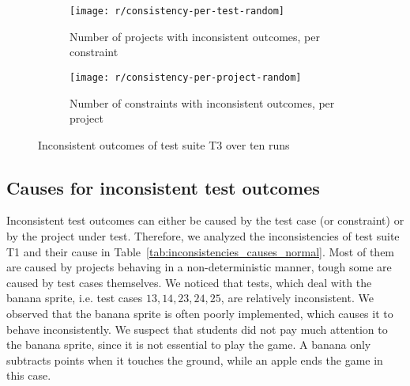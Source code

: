 \begin{figure}[htpb]
    \centering
    \begin{subfigure}{.75\textwidth}
        \texttt{[image: r/consistency-per-test-random]}%
        \vspace{-\medskipamount}
        \caption{Number of projects with inconsistent outcomes, per constraint}
        \label{fig:consistency_per_test_random}
    \end{subfigure}

    \bigskip

    \begin{subfigure}{.75\textwidth}
        \texttt{[image: r/consistency-per-project-random]}%
        \vspace{-\medskipamount}
        \caption{Number of constraints with inconsistent outcomes, per project}
        \label{fig:consistency_per_project_random}
    \end{subfigure}

    \caption{Inconsistent outcomes of test suite T3 over ten runs}
    \label{fig:consistency_random}
\end{figure}

\subsection{Causes for inconsistent test outcomes}

Inconsistent test outcomes can either be caused by the test case (or constraint) or by the project under test.
Therefore, we analyzed the inconsistencies of test suite T1 and their cause in Table~\ref{tab:inconsistencies_causes_normal}.
Most of them are caused by projects behaving in a non-deterministic manner,
tough some are caused by test cases themselves.
We noticed that tests, which deal with the banana sprite, i.e. test cases $13, 14, 23, 24, 25$, are relatively inconsistent.
We observed that the banana sprite is often poorly implemented, which causes it to behave inconsistently.
We suspect that students did not pay much attention to the banana sprite, since it is not essential to play the game.
A banana only subtracts points when it touches the ground, while an apple ends the game in this case.
\parspace

